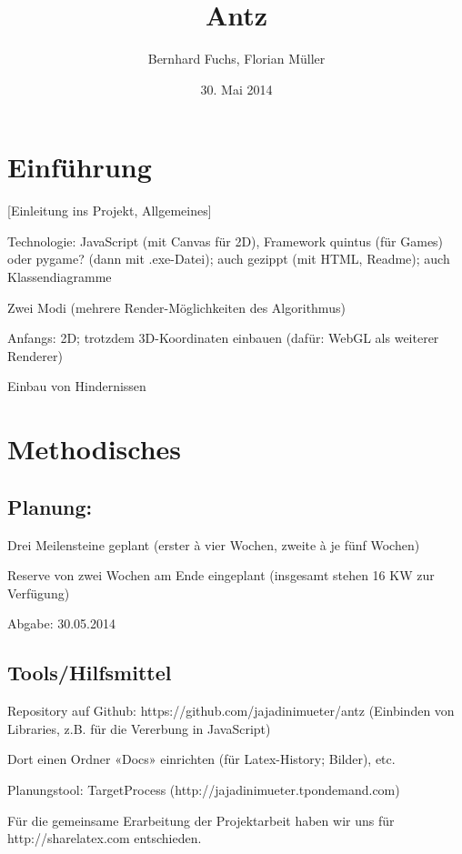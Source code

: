 \documentclass{article}
\title{Antz}
\author{Bernhard Fuchs, Florian Müller}
\date{30. Mai 2014}
\begin{document}
\maketitle





\section{Einführung}

[Einleitung ins Projekt, Allgemeines]

\vspace*{1cm}

\begin{compactitem}
\item Technologie: JavaScript (mit Canvas für 2D), Framework quintus (für Games) oder pygame? (dann mit .exe-Datei); auch gezippt (mit HTML, Readme); auch Klassendiagramme
\item Zwei Modi (mehrere Render-Möglichkeiten des Algorithmus)
\item Anfangs: 2D; trotzdem 3D-Koordinaten einbauen (dafür: WebGL als weiterer Renderer)
\item Einbau von Hindernissen
\end{compactitem}


\vspace*{1cm}


\section{Methodisches}


\subsection*{Planung:}

\begin{compactitem}
\item Drei Meilensteine geplant (erster à vier Wochen, zweite à je fünf Wochen)
\item Reserve von zwei Wochen am Ende eingeplant (insgesamt stehen 16 KW zur Verfügung)
\item Abgabe: 30.05.2014
\end{compactitem}


\vspace*{1cm}


\subsection*{Tools/Hilfsmittel}

\begin{compactitem}
\item Repository auf Github: https://github.com/jajadinimueter/antz (Einbinden von Libraries, z.B. für die Vererbung in JavaScript)
\item [Dort einen Ordner «Docs» einrichten (für Latex-History; Bilder), etc.]
\item Planungstool: TargetProcess (http://jajadinimueter.tpondemand.com)
\item Für die gemeinsame Erarbeitung der Projektarbeit haben wir uns für http://sharelatex.com entschieden.
\end{compactitem}
\end{document}

